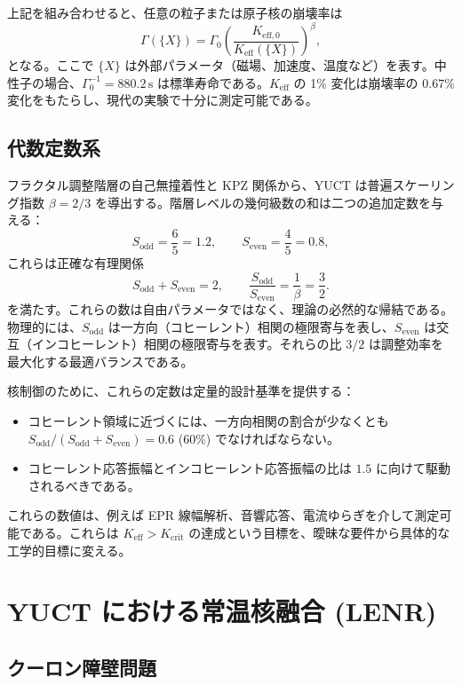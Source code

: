\documentclass[12pt]{article}
\newcommand{\Keff}{K_{\mathrm{eff}}}
\newcommand{\Keffzero}{K_{\mathrm{eff},0}}
\newcommand{\Kcrit}{K_{\mathrm{crit}}}
\newcommand{\Sodd}{S_{\mathrm{odd}}}
\newcommand{\Seven}{S_{\mathrm{even}}}
\theoremstyle{remark}
\begin{document}
	上記を組み合わせると、任意の粒子または原子核の崩壊率は
	\begin{equation}
		\Gamma(\{X\}) = \Gamma_0 \left( \frac{\Keffzero}{\Keff(\{X\})} \right)^{\beta},
		\label{eq:general-rate}
	\end{equation}
	となる。ここで \(\{X\}\) は外部パラメータ（磁場、加速度、温度など）を表す。中性子の場合、\(\Gamma_0^{-1} = 880.2\,\text{s}\) は標準寿命である。\(\Keff\) の 1\% 変化は崩壊率の \(0.67\%\) 変化をもたらし、現代の実験で十分に測定可能である。
	
	\subsection{代数定数系}
	\label{sec:algebraic}
	
	フラクタル調整階層の自己無撞着性と KPZ 関係から、YUCT は普遍スケーリング指数 \(\beta = 2/3\) を導出する。階層レベルの幾何級数の和は二つの追加定数を与える：
	\[
	\Sodd = \frac{6}{5}=1.2,\qquad \Seven = \frac{4}{5}=0.8,
	\]
	これらは正確な有理関係
	\[
	\Sodd + \Seven = 2,\qquad \frac{\Sodd}{\Seven} = \frac{1}{\beta} = \frac{3}{2}.
	\]
	を満たす。これらの数は自由パラメータではなく、理論の必然的な帰結である。物理的には、\(\Sodd\) は一方向（コヒーレント）相関の極限寄与を表し、\(\Seven\) は交互（インコヒーレント）相関の極限寄与を表す。それらの比 \(3/2\) は調整効率を最大化する最適バランスである。
	
	核制御のために、これらの定数は定量的設計基準を提供する：
	\begin{itemize}
		\item コヒーレント領域に近づくには、一方向相関の割合が少なくとも \(\Sodd/(\Sodd+\Seven)=0.6\) (60\%) でなければならない。
		\item コヒーレント応答振幅とインコヒーレント応答振幅の比は \(1.5\) に向けて駆動されるべきである。
	\end{itemize}
	これらの数値は、例えば EPR 線幅解析、音響応答、電流ゆらぎを介して測定可能である。これらは \(\Keff > \Kcrit\) の達成という目標を、曖昧な要件から具体的な工学的目標に変える。
	
	\section{YUCT における常温核融合 (LENR)}
	\label{sec:fusion}
	
	\subsection{クーロン障壁問題}
	
\end{document}
